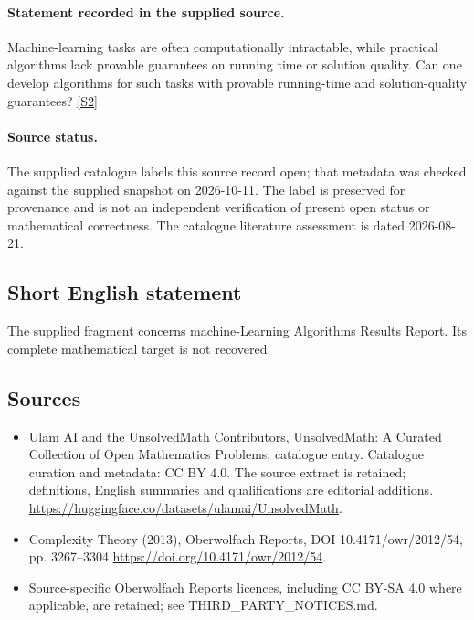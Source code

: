 \documentclass[11pt]{article}
\begin{document}
\paragraph{Statement recorded in the supplied source.}
Machine-learning tasks are often computationally intractable, while practical algorithms lack provable guarantees on running time or solution quality. Can one develop algorithms for such tasks with provable running-time and solution-quality guarantees? \href{https://doi.org/10.4171/owr/2012/54}{[S2]}
\paragraph{Source status.}
The supplied catalogue labels this source record open; that metadata was checked against the supplied snapshot on 2026-10-11. The label is preserved for provenance and is not an independent verification of present open status or mathematical correctness. The catalogue literature assessment is dated 2026-08-21.
\subsection{Short English statement}
The supplied fragment concerns machine-Learning Algorithms Results Report. Its complete mathematical target is not recovered.
\subsection{Sources}
\begin{itemize}
\item[S1] Ulam AI and the UnsolvedMath Contributors, UnsolvedMath: A Curated Collection of Open Mathematics Problems, catalogue entry. Catalogue curation and metadata: CC BY 4.0. The source extract is retained; definitions, English summaries and qualifications are editorial additions.
\url{https://huggingface.co/datasets/ulamai/UnsolvedMath}.
\item[S2] Complexity Theory (2013), Oberwolfach Reports, DOI 10.4171/owr/2012/54, pp. 3267--3304
\url{https://doi.org/10.4171/owr/2012/54}.
\item Source-specific Oberwolfach Reports licences, including CC BY-SA 4.0 where applicable, are retained; see THIRD\_PARTY\_NOTICES.md.
\end{itemize}
\end{document}

